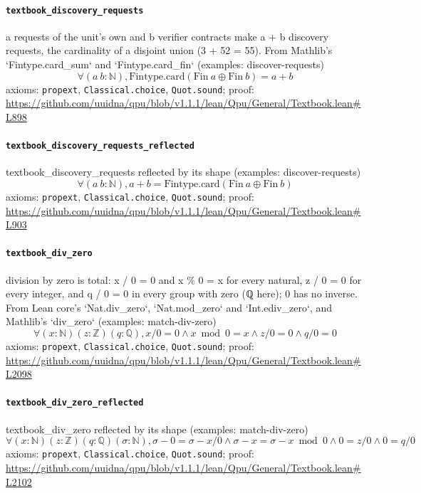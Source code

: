 \documentclass[11pt]{article}
\begin{document}
\paragraph{\texttt{textbook\_discovery\_requests}}
a requests of the unit's own and b verifier contracts make a + b discovery requests, the cardinality of a disjoint union (3 + 52 = 55). From Mathlib's `Fintype.card\_sum` and `Fintype.card\_fin` (examples: discover-requests)
\[ \forall (a\ b : \mathbb{N}), \mathrm{Fintype.card} (\mathrm{Fin}\ a \oplus \mathrm{Fin}\ b) = a + b \]
\noindent axioms: \texttt{propext}, \texttt{Classical.choice}, \texttt{Quot.sound}; proof: \url{https://github.com/uuidna/qpu/blob/v1.1.1/lean/Qpu/General/Textbook.lean\#L898}

\paragraph{\texttt{textbook\_discovery\_requests\_reflected}}
textbook\_discovery\_requests reflected by its shape (examples: discover-requests)
\[ \forall (a\ b : \mathbb{N}), a + b = \mathrm{Fintype.card} (\mathrm{Fin}\ a \oplus \mathrm{Fin}\ b) \]
\noindent axioms: \texttt{propext}, \texttt{Classical.choice}, \texttt{Quot.sound}; proof: \url{https://github.com/uuidna/qpu/blob/v1.1.1/lean/Qpu/General/Textbook.lean\#L903}

\paragraph{\texttt{textbook\_div\_zero}}
division by zero is total: x / 0 = 0 and x \% 0 = x for every natural, z / 0 = 0 for every integer, and q / 0 = 0 in every group with zero (ℚ here); 0 has no inverse. From Lean core's `Nat.div\_zero`, `Nat.mod\_zero` and `Int.ediv\_zero`, and Mathlib's `div\_zero` (examples: match-div-zero)
\[ \forall (x : \mathbb{N}) (z : \mathbb{Z}) (q : \mathbb{Q}), x / 0 = 0 \land x \bmod 0 = x \land z / 0 = 0 \land q / 0 = 0 \]
\noindent axioms: \texttt{propext}, \texttt{Classical.choice}, \texttt{Quot.sound}; proof: \url{https://github.com/uuidna/qpu/blob/v1.1.1/lean/Qpu/General/Textbook.lean\#L2098}

\paragraph{\texttt{textbook\_div\_zero\_reflected}}
textbook\_div\_zero reflected by its shape (examples: match-div-zero)
\[ \forall (x : \mathbb{N}) (z : \mathbb{Z}) (q : \mathbb{Q}) (\sigma : \mathbb{N}), \sigma - 0 = \sigma - x / 0 \land \sigma - x = \sigma - x \bmod 0 \land 0 = z / 0 \land 0 = q / 0 \]
\noindent axioms: \texttt{propext}, \texttt{Classical.choice}, \texttt{Quot.sound}; proof: \url{https://github.com/uuidna/qpu/blob/v1.1.1/lean/Qpu/General/Textbook.lean\#L2102}
\end{document}
